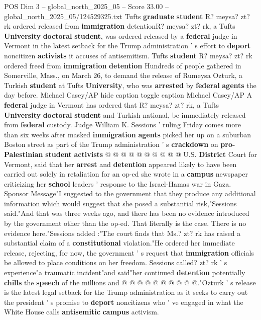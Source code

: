 \begin{textsample}{POS Dim 3 – global\_north\_2025\_05 – Score 33.00 – global\_north\_2025\_05/124529325.txt}  \label{ex:f3_pos_141}
Tufts \textbf{graduate} \textbf{student} R? meysa? zt? rk ordered released from \textbf{immigration} detentionR? meysa? zt? rk, a Tufts \textbf{University} \textbf{doctoral} \textbf{student}, was ordered released by a \textbf{federal} judge in Vermont in the latest setback for the Trump administration ' s effort to \textbf{deport} noncitizen \textbf{activists} it accuses of antisemitism.
Tufts \textbf{student} R? meysa? zt? rk ordered freed from \textbf{immigration} \textbf{detention} Hundreds of people gathered in Somerville, Mass., on March 26, to demand the release of Rumeysa Ozturk, a Turkish \textbf{student} at Tufts \textbf{University}, who was \textbf{arrested} by \textbf{federal} \textbf{agents} the day before.
Michael Casey/AP hide caption toggle caption Michael Casey/AP A \textbf{federal} judge in Vermont has ordered that R? meysa? zt? rk, a Tufts \textbf{University} \textbf{doctoral} \textbf{student} and Turkish national, be immediately released from \textbf{federal} custody.
Judge William K.
Sessions ' ruling Friday comes more than six weeks after masked \textbf{immigration} \textbf{agents} picked her up on a suburban Boston street as part of the Trump administration ' s \textbf{crackdown} on \textbf{pro-Palestinian} \textbf{student} \textbf{activists} @ @ @ @ @ @ @ @ @ @ U.S. \textbf{District} Court for Vermont, said that her \textbf{arrest} and \textbf{detention} appeared likely to have been carried out solely in retaliation for an op-ed she wrote in a \textbf{campus} newspaper criticizing her \textbf{school} leaders ' response to the Israel-Hamas war in Gaza.
Sponsor Message"I suggested to the government that they produce any additional information which would suggest that she posed a substantial risk,"Sessions said."And that was three weeks ago, and there has been no evidence introduced by the government other than the op-ed.
That literally is the case.
There is no evidence here."Sessions added :"The court finds that Ms.? zt? rk has raised a substantial claim of a \textbf{constitutional} violation."He ordered her immediate release, rejecting, for now, the government ' s request that \textbf{immigration} officials be allowed to place conditions on her freedom.
Sessions called? zt? rk ' s experience"a traumatic incident"and said"her continued \textbf{detention} potentially \textbf{chills} the \textbf{speech} of the millions and @ @ @ @ @ @ @ @ @ @."Ozturk ' s release is the latest legal setback for the Trump administration as it seeks to carry out the president ' s promise to \textbf{deport} noncitizens who ' ve engaged in what the White House calls \textbf{antisemitic} \textbf{campus} activism.

\end{textsample}
